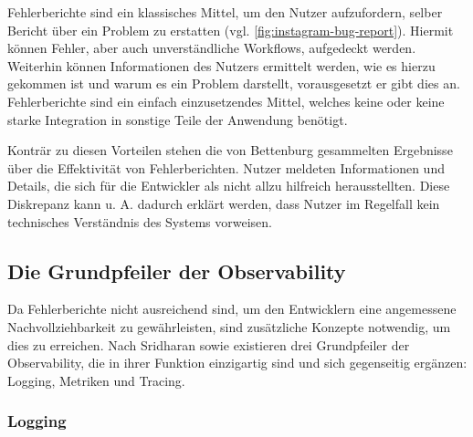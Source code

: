 Fehlerberichte sind ein klassisches Mittel, um den Nutzer aufzufordern, selber Bericht über ein Problem zu erstatten (vgl. \autoref{fig:instagram-bug-report}). Hiermit können Fehler, aber auch unverständliche Workflows, aufgedeckt werden. Weiterhin können Informationen des Nutzers ermittelt werden, wie es hierzu gekommen ist und warum es ein Problem darstellt, vorausgesetzt er gibt dies an. Fehlerberichte sind ein einfach einzusetzendes Mittel, welches keine oder keine starke Integration in sonstige Teile der Anwendung benötigt.

Konträr zu diesen Vorteilen stehen die von Bettenburg \etal \cite{WhatMakesAGoodBugReport} gesammelten Ergebnisse über die Effektivität von Fehlerberichten. Nutzer meldeten Informationen und Details, die sich für die Entwickler als nicht allzu hilfreich herausstellten. Diese Diskrepanz kann u. A. dadurch erklärt werden, dass Nutzer im Regelfall kein technisches Verständnis des Systems vorweisen.

\subsection{Die Grundpfeiler der Observability}

Da Fehlerberichte nicht ausreichend sind, um den Entwicklern eine angemessene Nachvollziehbarkeit zu gewährleisten, sind zusätzliche Konzepte notwendig, um dies zu erreichen. Nach Sridharan \etal \cite{DistributedSystemsObservability} sowie \cite{TraefikLogsRequestTracingAndMetrics} \cite{IntrospectiveOfTheCloudManagementToolbox} \cite{MultilevelObservabilityInCloudOrchestration} existieren drei Grundpfeiler der Observability, die in ihrer Funktion einzigartig sind und sich gegenseitig ergänzen: Logging, Metriken und Tracing.

\subsubsection{Logging}


